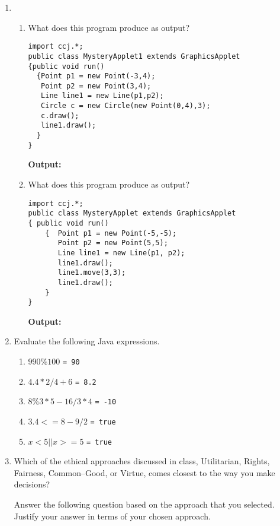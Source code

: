 \begin{enumerate}

\item \begin{enumerate}
\item What does this program produce as output?

\begin{verbatim}
import ccj.*;
public class MysteryApplet1 extends GraphicsApplet
{public void run()
  {Point p1 = new Point(-3,4);
   Point p2 = new Point(3,4);
   Line line1 = new Line(p1,p2);
   Circle c = new Circle(new Point(0,4),3);
   c.draw();
   line1.draw();
  }
}
\end{verbatim}
        {\bf Output:}

    \item What does this program produce as output?
\begin{verbatim}
import ccj.*;
public class MysteryApplet extends GraphicsApplet
{ public void run()
    {  Point p1 = new Point(-5,-5);
       Point p2 = new Point(5,5);
       Line line1 = new Line(p1, p2);
       line1.draw();
       line1.move(3,3);
       line1.draw();
    }
}
\end{verbatim}
        {\bf Output:}

\end{enumerate}


    \item Evaluate the following Java expressions.

 \begin{enumerate}
    \item $990 \% 100$ {\tt = 90}

    \item $4.4 * 2/4 + 6$ {\tt = 8.2}

    \item $8 \% 3 * 5 - 16/3 * 4$ {\tt = -10}

    \item $3.4 <= 8 - 9/2$ {\tt = true}

    \item $ x < 5 || x >= 5$ {\tt = true}

\end{enumerate}
    \item Which of the ethical approaches discussed in class, Utilitarian,
    Rights, Fairness, Common--Good, or Virtue, comes closest to the
    way you make decisions?

\vspace{1cm}
    Answer the following question based on the approach that you selected.
    Justify your answer in terms of your chosen approach.


\end{enumerate}
